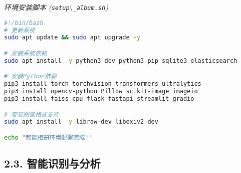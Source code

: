 \emph{环境安装脚本 (\passthrough{\lstinline!setup\_album.sh!})}

\begin{lstlisting}[language=bash]
#!/bin/bash
# 更新系统
sudo apt update && sudo apt upgrade -y

# 安装系统依赖
sudo apt install -y python3-dev python3-pip sqlite3 elasticsearch

# 安装Python依赖
pip3 install torch torchvision transformers ultralytics
pip3 install opencv-python Pillow scikit-image imageio
pip3 install faiss-cpu flask fastapi streamlit gradio

# 安装图像格式支持
sudo apt install -y libraw-dev libexiv2-dev

echo "智能相册环境配置完成!"
\end{lstlisting}

\subsection{2.3.
智能识别与分析}\label{ux667aux80fdux8bc6ux522bux4e0eux5206ux6790}

